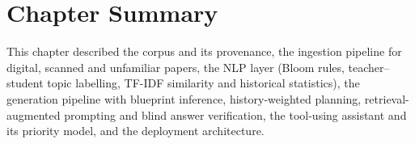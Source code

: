 \section{Chapter Summary}
This chapter described the corpus and its provenance, the ingestion pipeline for digital, scanned and unfamiliar papers,
the NLP layer (Bloom rules, teacher--student topic labelling, TF-IDF similarity and historical statistics), the
generation pipeline with blueprint inference, history-weighted planning, retrieval-augmented prompting and blind answer
verification, the tool-using assistant and its priority model, and the deployment architecture.
